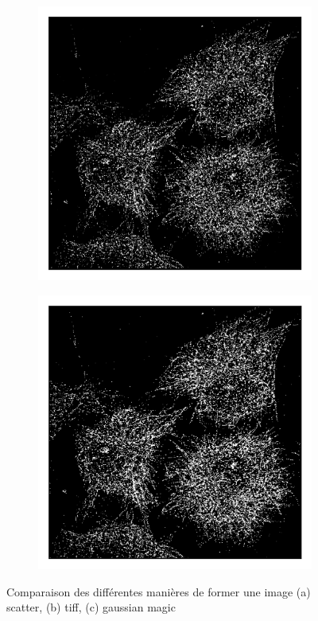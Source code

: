 \begin{figure}
\begin{subfigure}{0.32\textwidth}
        \includegraphics[width=\textwidth]{figures/test_imshow.png}
        \caption{}
    \end{subfigure}
    \begin{subfigure}{0.32\textwidth}
        \includegraphics[width=\textwidth]{figures/gaussian_test.png}
        \caption{}
    \end{subfigure}
    \caption{Comparaison des différentes manières de former une image
    (a) scatter, (b) tiff, (c) gaussian magic}
\end{figure}